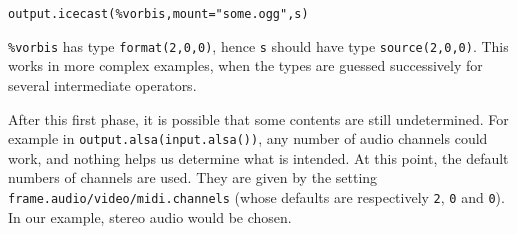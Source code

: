 \begin{verbatim}
output.icecast(%vorbis,mount="some.ogg",s)
\end{verbatim}
\verb+%vorbis+ has type \verb+format(2,0,0)+, hence \verb+s+
should have type \verb+source(2,0,0)+. This works in more complex
examples, when the types are guessed successively for several intermediate
operators.

After this first phase, it is possible that some contents are still
undetermined. For example in \verb+output.alsa(input.alsa())+,
any number of audio channels could work, and nothing helps us determine
what is intended. At this point, the default numbers of channels are
used. They are given by the setting 
\verb+frame.audio/video/midi.channels+ (whose defaults are respectively
\verb+2+, \verb+0+ and \verb+0+). In our example,
stereo audio would be chosen.


